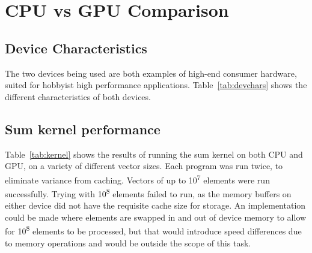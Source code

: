 
\section{CPU vs GPU Comparison}
\subsection{Device Characteristics}
The two devices being used are both examples of high-end consumer hardware, suited for hobbyist high performance applications. Table~\ref{tab:devchars} shows the different characteristics of both devices.

\begin{table}[h]
\centering
{}
\caption{Comparison of device characteristics}
\label{tab:devchars}

\end{table}




\subsection{Sum kernel performance}
Table~\ref{tab:kernel} shows the results of running the sum kernel on both CPU and GPU, on a variety of different vector sizes. Each program was run twice, to eliminate variance from caching. Vectors of up to 10\textsuperscript{7} elements were run successfully. Trying with 10\textsuperscript{8} elements failed to run, as the memory buffers on either device did not have the requisite cache size for storage. An implementation could be made where elements are swapped in and out of device memory to allow for 10\textsuperscript{8} elements to be processed, but that would introduce speed differences due to memory operations and would be outside the scope of this task. 



